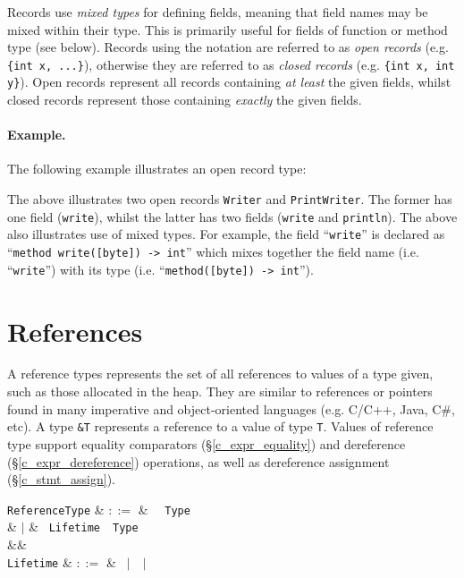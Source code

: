 Records use {\em mixed types} for defining fields, meaning that field names may be mixed within their type.  This is primarily useful for fields of function or method type (see below).  Records using the  notation are referred to as {\em open records} (e.g. \lstinline|{int x, ...}|), otherwise they are referred to as {\em closed records} (e.g. \lstinline|{int x, int y}|).  Open records represent all records containing {\em at least} the given fields, whilst closed records represent those containing {\em exactly} the given fields.   
\paragraph{Example.} The following example illustrates an open record type: 



The above illustrates two open records \lstinline{Writer} and \lstinline{PrintWriter}.  The former has one field (\lstinline{write}), whilst the latter has two fields (\lstinline{write} and \lstinline{println}).  The above also illustrates use of mixed types.  For example, the field ``\lstinline{write}'' is declared as ``\lstinline{method write([byte]) -> int}'' which mixes together the field name (i.e. ``\lstinline{write}'') with its type (i.e. ``\lstinline{method([byte]) -> int}'').


\section{References}
\label{c_types_reference}
A reference types represents the set of all references to values of a type given, such as those allocated in the heap.  They are similar to references or pointers found in many imperative and object-oriented languages (e.g. C/C++, Java, C\#, etc).  A type \lstinline{&T} represents a reference to a value of type \lstinline{T}.  Values of reference type support equality comparators (\S\ref{c_expr_equality}) and dereference (\S\ref{c_expr_dereference}) operations, as well as dereference assignment (\S\ref{c_stmt_assign}).

\begin{syntax}
  \verb+ReferenceType+ & $::=$ & \token{\&}\ \ \verb+Type+\\
                       & $|$   & \token{\&}\ \verb+Lifetime+\ \token{:}\ \verb+Type+\\
  &&\\
  \verb+Lifetime+ & $::=$ & \token{*}\ $|$\ \ $|$\ \\
\end{syntax}


